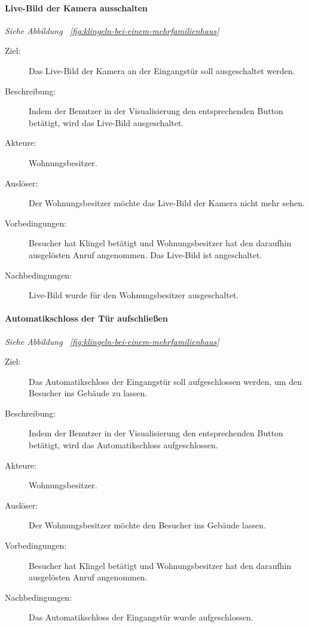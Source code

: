 \paragraph{\large{Live-Bild der Kamera ausschalten}}
\textit{Siehe Abbildung ~\ref{fig:klingeln-bei-einem-mehrfamilienhaus}}
    \begin{description}
        \item[Ziel:] Das Live-Bild der Kamera an der Eingangstür soll ausgeschaltet werden.
        \item[Beschreibung:] Indem der Benutzer in der Visualisierung den entsprechenden Button betätigt, wird das Live-Bild ausgeschaltet.
        \item[Akteure:] Wohnungsbesitzer.
        \item[Auslöser:] Der Wohnungsbesitzer möchte das Live-Bild der Kamera nicht mehr sehen.
        \item[Vorbedingungen:] Besucher hat Klingel betätigt und Wohnungsbesitzer hat den daraufhin ausgelösten Anruf angenommen.
            Das Live-Bild ist angeschaltet.
        \item[Nachbedingungen:] Live-Bild wurde für den Wohnungsbesitzer ausgeschaltet.
    \end{description}

\paragraph{\large{Automatikschloss der Tür aufschließen}}
\textit{Siehe Abbildung ~\ref{fig:klingeln-bei-einem-mehrfamilienhaus}}
    \begin{description}
        \item[Ziel:] Das Automatikschloss der Eingangstür soll aufgeschlossen werden, um den Besucher ins Gebäude zu lassen.
        \item[Beschreibung:] Indem der Benutzer in der Visualisierung den entsprechenden Button betätigt, wird das Automatikschloss aufgeschlossen.
        \item[Akteure:] Wohnungsbesitzer.
        \item[Auslöser:] Der Wohnungsbesitzer möchte den Besucher ins Gebäude lassen.
        \item[Vorbedingungen:] Besucher hat Klingel betätigt und Wohnungsbesitzer hat den daraufhin ausgelösten Anruf angenommen.
        \item[Nachbedingungen:] Das Automatikschloss der Eingangstür wurde aufgeschlossen.
    \end{description}

